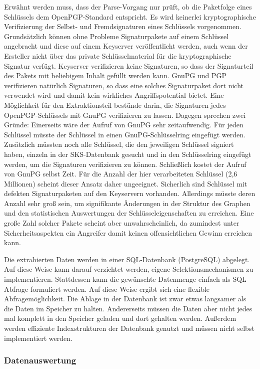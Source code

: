 Erwähnt werden muss, dass der Parse-Vorgang nur prüft, ob die
Paketfolge eines Schlüssels dem OpenPGP-Standard entspricht. Es wird
keinerlei kryptographische Verifizierung der Selbst- und
Fremdsignaturen eines Schlüssels vorgenommen. Grundsätzlich können
ohne Probleme Signaturpakete auf einem Schlüssel angebracht und diese
auf einem Keyserver veröffentlicht werden, auch wenn der Ersteller
nicht über das private Schlüsselmaterial für die kryptographische
Signatur verfügt. Keyserver verifizieren keine Signaturen, so dass der
Signaturteil des Pakets mit beliebigem Inhalt gefüllt werden
kann. GnuPG und PGP verifizieren natürlich Signaturen, so dass eine
solches Signaturpaket dort nicht verwendet wird und damit kein
wirkliches Angriffspotential bietet. Eine Möglichkeit für den
Extraktionsteil bestünde darin, die Signaturen jedes
OpenPGP-Schlüssels mit GnuPG verifizieren zu lassen. Dagegen sprechen
zwei Gründe: Einerseits wäre der Aufruf von GnuPG sehr
zeitaufwendig. Für jeden Schlüssel müsste der Schlüssel in einen
GnuPG-Schlüsselring eingefügt werden. Zusätzlich müssten noch alle
Schlüssel, die den jeweiligen Schlüssel signiert haben, einzeln in der
SKS-Datenbank gesucht und in den Schlüsselring eingefügt werden, um
die Signaturen verifizieren zu können. Schlie{\ss}lich kostet der Aufruf
von GnuPG selbst Zeit. Für die Anzahl der hier verarbeiteten Schlüssel
(2,6 Millionen) scheint dieser Ansatz daher ungeeignet. Sicherlich
sind Schlüssel mit defekten Signaturpaketen auf den Keyservern
vorhanden. Allerdings müsste deren Anzahl sehr groß sein, um
signifikante Änderungen in der Struktur des Graphen und den
statistischen Auswertungen der Schlüsseleigenschaften zu
erreichen. Eine große Zahl solcher Pakete scheint aber
unwahrscheinlich, da zumindest unter Sicherheitsaspekten ein Angreifer
damit keinen offensichtlichen Gewinn erreichen kann.

Die extrahierten Daten werden in einer SQL-Datenbank (PostgreSQL)
abgelegt. Auf diese Weise kann darauf verzichtet werden, eigene
Selektionsmechanismen zu implementieren. Stattdessen kann die
gewünschte Datenmenge einfach als SQL-Abfrage formuliert werden. Auf
diese Weise ergibt sich eine flexible 
Abfragemöglichkeit. Die Ablage in der Datenbank ist zwar etwas
langsamer als die Daten im Speicher zu halten. Andererseits müssen die
Daten aber nicht jedes mal komplett in den Speicher geladen und dort
gehalten werden. Außerdem werden effiziente Indexstrukturen der
Datenbank genutzt und müssen nicht selbst implementiert werden.

\subsubsection{Datenauswertung}
\label{sec:datenauswertung}

